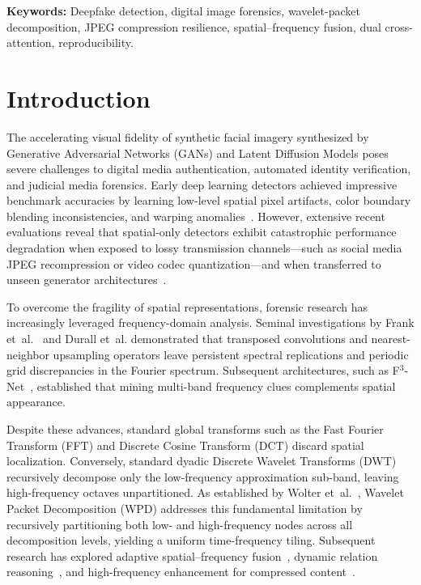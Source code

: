 \documentclass[11pt,a4paper]{article}
\begin{document}
\noindent\textbf{Keywords:} Deepfake detection, digital image forensics, wavelet-packet decomposition, JPEG compression resilience, spatial--frequency fusion, dual cross-attention, reproducibility.

\section{Introduction}
\label{sec:intro}

The accelerating visual fidelity of synthetic facial imagery synthesized by Generative Adversarial Networks (GANs) and Latent Diffusion Models poses severe challenges to digital media authentication, automated identity verification, and judicial media forensics. Early deep learning detectors achieved impressive benchmark accuracies by learning low-level spatial pixel artifacts, color boundary blending inconsistencies, and warping anomalies~\cite{rossler2019faceforensics,chollet2017xception}. However, extensive recent evaluations reveal that spatial-only detectors exhibit catastrophic performance degradation when exposed to lossy transmission channels---such as social media JPEG recompression or video codec quantization---and when transferred to unseen generator architectures~\cite{kashiani2025freqdebias,chandra2024deepfakeeval}.

To overcome the fragility of spatial representations, forensic research has increasingly leveraged frequency-domain analysis. Seminal investigations by Frank et~al.~\cite{frank2020leveraging} and Durall et~al. demonstrated that transposed convolutions and nearest-neighbor upsampling operators leave persistent spectral replications and periodic grid discrepancies in the Fourier spectrum. Subsequent architectures, such as F$^3$-Net~\cite{qian2020thinking}, established that mining multi-band frequency clues complements spatial appearance. 

Despite these advances, standard global transforms such as the Fast Fourier Transform (FFT) and Discrete Cosine Transform (DCT) discard spatial localization. Conversely, standard dyadic Discrete Wavelet Transforms (DWT) recursively decompose only the low-frequency approximation sub-band, leaving high-frequency octaves unpartitioned. As established by Wolter et~al.~\cite{wolter2022wavelet}, Wavelet Packet Decomposition (WPD) addresses this fundamental limitation by recursively partitioning both low- and high-frequency nodes across all decomposition levels, yielding a uniform time-frequency tiling. Subsequent research has explored adaptive spatial--frequency fusion~\cite{wang2024deepfake}, dynamic relation reasoning~\cite{wang2023dynamic}, and high-frequency enhancement for compressed content~\cite{gao2024deepfake}.
\end{document}

